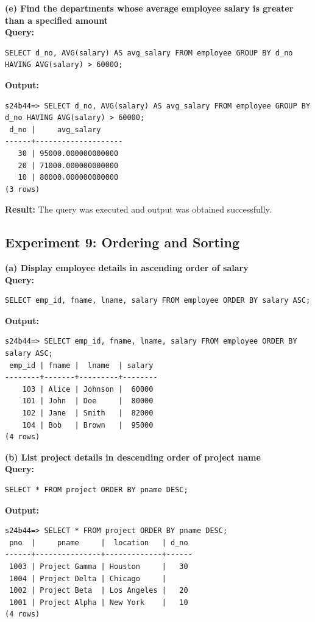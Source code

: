 \documentclass[12pt, a4paper]{article}
\begin{document}
\textbf{(e) Find the departments whose average employee salary is greater than a specified amount}\\
\textbf{Query:}
\begin{lstlisting}
SELECT d_no, AVG(salary) AS avg_salary FROM employee GROUP BY d_no HAVING AVG(salary) > 60000;
\end{lstlisting}
\textbf{Output:}
\begin{lstlisting}[style=terminal]
s24b44=> SELECT d_no, AVG(salary) AS avg_salary FROM employee GROUP BY d_no HAVING AVG(salary) > 60000;
 d_no |     avg_salary     
------+--------------------
   30 | 95000.000000000000
   20 | 71000.000000000000
   10 | 80000.000000000000
(3 rows)
\end{lstlisting}
\textbf{Result:} The query was executed and output was obtained successfully.


\newpage
\subsection*{Experiment 9: Ordering and Sorting}

\textbf{(a) Display employee details in ascending order of salary}\\
\textbf{Query:}
\begin{lstlisting}
SELECT emp_id, fname, lname, salary FROM employee ORDER BY salary ASC;
\end{lstlisting}
\textbf{Output:}
\begin{lstlisting}[style=terminal]
s24b44=> SELECT emp_id, fname, lname, salary FROM employee ORDER BY salary ASC;
 emp_id | fname |  lname  | salary 
--------+-------+---------+--------
    103 | Alice | Johnson |  60000
    101 | John  | Doe     |  80000
    102 | Jane  | Smith   |  82000
    104 | Bob   | Brown   |  95000
(4 rows)
\end{lstlisting}

\textbf{(b) List project details in descending order of project name}\\
\textbf{Query:}
\begin{lstlisting}
SELECT * FROM project ORDER BY pname DESC;
\end{lstlisting}
\textbf{Output:}
\begin{lstlisting}[style=terminal]
s24b44=> SELECT * FROM project ORDER BY pname DESC;
 pno  |     pname     |  location   | d_no 
------+---------------+-------------+------
 1003 | Project Gamma | Houston     |   30
 1004 | Project Delta | Chicago     |     
 1002 | Project Beta  | Los Angeles |   20
 1001 | Project Alpha | New York    |   10
(4 rows)
\end{lstlisting}
\end{document}
